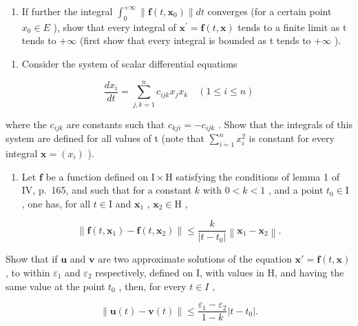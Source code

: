 \begin{enumerate}
\def\labelenumi{\alph{enumi})}
\setcounter{enumi}{1}
\tightlist
\item
  If further the integral \(\int_{0}^{+\infty}\|\mathbf{f}(t,\mathbf{x}_{0})\|dt\) converges (for a certain point \(x_{0}\in E\) ), show that every integral of \(\mathbf{x}^{\prime}=\mathbf{f}(t,\mathbf{x})\) tends to a finite limit as t tends to \(+\infty\) (first show that every integral is bounded as t tends to \(+\infty\) ).
\end{enumerate}

\begin{enumerate}
\def\labelenumi{\arabic{enumi})}
\setcounter{enumi}{6}
\tightlist
\item
  Consider the system of scalar differential equations
\end{enumerate}

\[
\frac {d x _ {i}}{d t} = \sum_ {j, k = 1} ^ {n} c _ {i j k} x _ {j} x _ {k} \quad (1 \leqslant i \leqslant n)
\]

where the \(c_{ijk}\) are constants such that \(c_{kji} = -c_{ijk}\) . Show that the integrals of this system are defined for all values of t (note that \(\sum_{i=1}^{n} x_{i}^{2}\) is constant for every integral \(\mathbf{x} = (x_{i})\) ).

\begin{enumerate}
\def\labelenumi{\arabic{enumi})}
\setcounter{enumi}{7}
\tightlist
\item
  Let \(\mathbf{f}\) be a function defined on \(\mathrm{I} \times \mathrm{H}\) satisfying the conditions of lemma 1 of IV, p.~165, and such that for a constant \(k\) with \(0 < k < 1\) , and a point \(t_0 \in \mathrm{I}\) , one has, for all \(t \in \mathrm{I}\) and \(\mathbf{x}_1\) , \(\mathbf{x}_2 \in \mathrm{H}\) ,
\end{enumerate}

\[
\left\| \mathbf {f} (t, \mathbf {x} _ {1}) - \mathbf {f} (t, \mathbf {x} _ {2}) \right\| \leqslant \frac {k}{\left| t - t _ {0} \right|} \left\| \mathbf {x} _ {1} - \mathbf {x} _ {2} \right\|.
\]

Show that if \(\mathbf{u}\) and \(\mathbf{v}\) are two approximate solutions of the equation \(\mathbf{x}' = \mathbf{f}(t, \mathbf{x})\) , to within \(\varepsilon_1\) and \(\varepsilon_2\) respectively, defined on I, with values in H, and having the same value at the point \(t_0\) , then, for every \(t \in I\) ,

\[
\left\| \mathbf {u} (t) - \mathbf {v} (t) \right\| \leqslant \frac {\varepsilon_ {1} - \varepsilon_ {2}}{1 - k} | t - t _ {0} |.
\]

